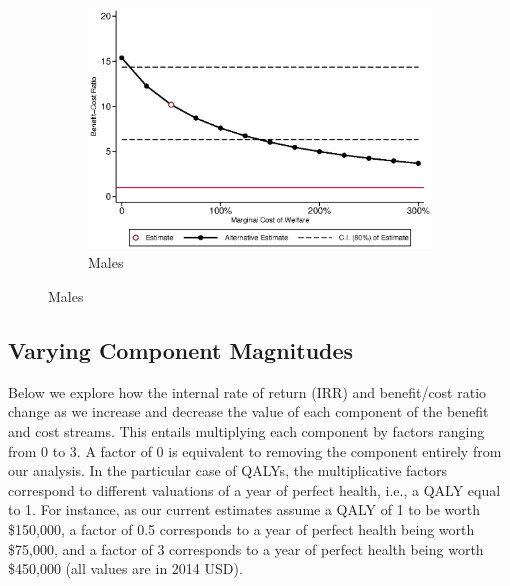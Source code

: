 \begin{figure}[H]
	\begin{subfigure}[h]{0.8\textwidth}
	\centering
	\caption{Males} \label{fig:bcr_dwl_m}
	\includegraphics[width=\textwidth]{AppOutput/Sensitivity/bcr_dwl_m1.eps}
	\end{subfigure}
\end{figure}

\subsection{Varying Component Magnitudes}
\label{app:sa_factors}

\noindent Below we explore how the internal rate of return (IRR) and benefit/cost ratio change as
we increase and decrease the value of each component of the benefit and cost streams. This entails
multiplying each component by factors ranging from 0 to 3. A factor of 0 is equivalent
to removing the component entirely from our analysis. In the particular
case of QALYs, the multiplicative factors correspond to different valuations of a year of perfect
health, i.e., a QALY equal to 1. For instance, as our current estimates assume a QALY of 1 to be worth
\$150,000, a factor of 0.5 corresponds to a year of perfect health being
worth \$75,000, and a factor of 3 corresponds to a year of perfect health
being worth \$450,000 (all values are in 2014 USD). 

